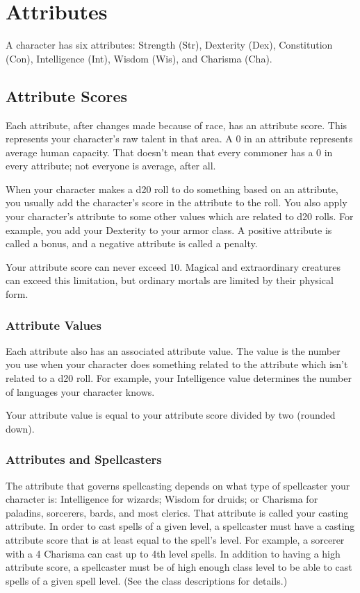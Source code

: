 \chapter{Attributes}
A character has six attributes: Strength (Str), Dexterity (Dex), Constitution (Con), Intelligence (Int), Wisdom (Wis), and Charisma (Cha).

\section{Attribute Scores}
Each attribute, after changes made because of race, has an attribute score. This represents your character's raw talent in that area. A 0 in an attribute represents average human capacity. That doesn't mean that every commoner has a 0 in every attribute; not everyone is average, after all.

When your character makes a d20 roll to do something based on an attribute, you usually add the character's score in the attribute to the roll. You also apply your character's attribute to some other values which are related to d20 rolls. For example, you add your Dexterity to your armor class. A positive attribute is called a bonus, and a negative attribute is called a penalty.

Your attribute score can never exceed 10. Magical and extraordinary creatures can exceed this limitation, but ordinary mortals are limited by their physical form.

\subsection{Attribute Values}
Each attribute also has an associated attribute value. The value is the number you use when your character does something related to the attribute which isn't related to a d20 roll. For example, your Intelligence value determines the number of languages your character knows.

Your attribute value is equal to your attribute score divided by two (rounded down).

\subsection{Attributes and Spellcasters}
The attribute that governs spellcasting depends on what type of spellcaster your character is: Intelligence for wizards; Wisdom for druids; or Charisma for paladins, sorcerers, bards, and most clerics. That attribute is called your casting attribute. In order to cast spells of a given level, a spellcaster must have a casting attribute score that is at least equal to the spell's level. For example, a sorcerer with a 4 Charisma can cast up to 4th level spells. In addition to having a high attribute score, a spellcaster must be of high enough class level to be able to cast spells of a given spell level. (See the class descriptions for details.)

